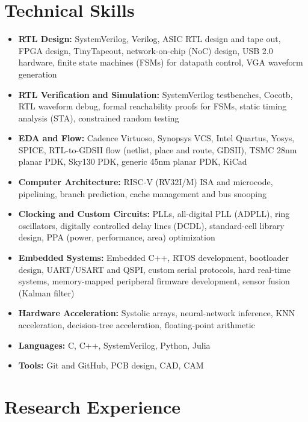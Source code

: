 \documentclass[10pt,letterpaper]{article}
\newcommand{\tightlist}{%
  \setlength{\itemsep}{0pt}%
  \setlength{\leftmargin}{1.0em}%
  \setlength{\parskip}{0pt}%
  \setlength{\topsep}{1.5pt}%
  \setlength{\parsep}{0pt}%
}
\newcommand{\cvsection}[1]{%
  \vspace*{-11pt}%
  \section*{#1}%
  \vspace*{-10pt}%
}
\begin{document}
\cvsection{Technical Skills}
\begin{itemize}\tightlist
  \item \textbf{RTL Design:} SystemVerilog, Verilog, ASIC RTL design and tape
    out, FPGA design, TinyTapeout, network-on-chip (NoC) design, USB 2.0
    hardware, finite state machines (FSMs) for datapath control, VGA waveform
    generation
  \item \textbf{RTL Verification and Simulation:} SystemVerilog testbenches,
    Cocotb, RTL waveform debug, formal reachability proofs for FSMs, static
    timing analysis (STA), constrained random testing
  \item \textbf{EDA and Flow:} Cadence Virtuoso, Synopsys VCS, Intel Quartus,
    Yosys, SPICE, RTL-to-GDSII flow (netlist, place and route,
    GDSII), TSMC 28nm planar PDK, Sky130 PDK, generic 45nm planar PDK, KiCad
  \item \textbf{Computer Architecture:} RISC-V (RV32I/M) ISA and microcode,
    pipelining, branch prediction, cache management and bus snooping
  \item \textbf{Clocking and Custom Circuits:} PLLs, all-digital PLL (ADPLL),
    ring oscillators, digitally controlled delay lines (DCDL), standard-cell
    library design, PPA (power, performance, area) optimization
  \item \textbf{Embedded Systems:} Embedded C++, RTOS development, bootloader
    design, UART/USART and QSPI, custom serial protocols, hard real-time
    systems, memory-mapped peripheral firmware development, sensor fusion
    (Kalman filter)
  \item \textbf{Hardware Acceleration:} Systolic arrays, neural-network
    inference, KNN acceleration, decision-tree acceleration, floating-point
    arithmetic
  \item \textbf{Languages:} C, C++, SystemVerilog, Python, Julia
  \item \textbf{Tools:} Git and GitHub, PCB design, CAD, CAM
\end{itemize}

\cvsection{Research Experience}
\end{document}
